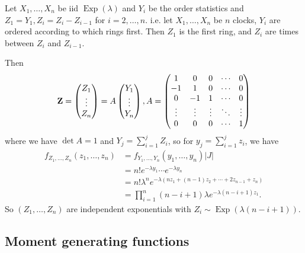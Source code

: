 \begin{example}
    Let $X_1,\ldots,X_n$ be iid $\operatorname{Exp}(\lambda)$ and $Y_i$ be the order statistics and $Z_1=Y_1,Z_i=Z_i-Z_{i-1}$ for $i=2,\ldots,n$.
    i.e. let $X_1,\dots,X_n$ be $n$ clocks, $Y_i$ are ordered according to which rings first. Then $Z_1$ is the first ring, and $ Z_i $ are times between $ Z_i $ and $ Z_{i-1} $.

    Then
    $${\bf Z}=\begin{pmatrix}
        Z_1\\
        \vdots\\
        Z_n
    \end{pmatrix}=A\begin{pmatrix}
        Y_1\\
        \vdots\\
        Y_n
    \end{pmatrix},A=\begin{pmatrix}
        1&0&0&\cdots&0\\
        -1&1&0&\cdots&0\\
        0&-1&1&\cdots&0\\
        \vdots&\vdots&\vdots&\ddots&\vdots\\
        0&0&0&\cdots&1
    \end{pmatrix}$$
    where we have $\det A=1$ and $Y_j=\sum_{i=1}^jZ_i$, so for $y_j=\sum_{i=1}^jz_i$, we have
    \begin{align*}
        f_{Z_1,\ldots,Z_n}(z_1,\ldots,z_n)&=f_{Y_1,\ldots,Y_n}(y_1,\ldots,y_n)|J|\\
        &=n!e^{-\lambda y_1}\cdots e^{-\lambda y_n}\\
        &=n!\lambda^ne^{-\lambda(nz_1+(n-1)z_2+\cdots +2z_{n-1}+z_n)}\\
        &=\prod_{i=1}^n(n-i+1)\lambda e^{-\lambda(n-i+1)z_1}.
    \end{align*}
    So $(Z_1,\ldots,Z_n)$ are independent exponentials with $Z_i\sim\operatorname{Exp}(\lambda(n-i+1))$.
\end{example}

\subsection{Moment generating functions}
